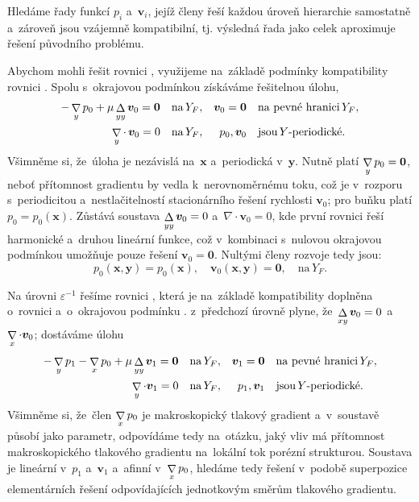 Hledáme řady funkcí $p_i$ a~$\bm{v}_i$, jejíž členy řeší každou úroveň hierarchie samostatně a~zároveň jsou vzájemně kompatibilní, tj. výsledná řada jako celek aproximuje řešení původního problému. 

Abychom mohli řešit rovnici , využijeme na~základě podmínky kompatibility rovnici . Spolu s~okrajovou podmínkou  získáváme řešitelnou úlohu,
\begin{subequations}
\begin{align}
    -\mathop{\nabla}\limits_{y} p_0 +\mu \mathop{\Delta}\limits_{yy} \bm{v}_0=\bm{0}\quad\textrm{na}\,Y_F,&&\bm{v}_0=\bm{0}\quad&\textrm{na pevné hranici}\,Y_F,\\
    \mathop{\nabla}\limits_{y} \cdot\, \bm{v}_0=0\quad\textrm{na}\,Y_F,&&p_0,\bm{v}_0\quad&\textrm{jsou}\,Y\textrm{-periodické}.
\end{align}
\end{subequations}
Všimněme si, že~úloha je nezávislá na~$\bm{x}$ a~periodická v~$\bm{y}$. Nutně platí $\mathop{\nabla}\limits_{y} p_0 = \bm{0}$, neboť přítomnost gradientu by vedla k~nerovnoměrnému toku, což je v~rozporu s~periodicitou a~nestlačitelností stacionárního řešení rychlosti $\bm{v}_0$; pro buňku platí $p_0=p_0(\bm{x})$. Zůstává soustava $\mathop{\Delta}\limits_{yy} \bm{v}_0=0$ a~$\nabla \cdot \bm{v}_0=0$, kde první rovnici řeší harmonické a~druhou lineární funkce, což v~kombinaci s~nulovou okrajovou podmínkou umožňuje pouze řešení $\bm{v}_0=\bm{0}$. Nultými členy rozvoje tedy jsou:
\begin{equation}
p_0(\bm{x},\bm{y})=p_0(\bm{x}),\quad \bm{v}_0(\bm{x},\bm{y})=\bm{0},\quad\textrm{na}\,Y_F.
\end{equation}

Na úrovni $\varepsilon^{-1}$ řešíme rovnici , která je na~základě kompatibility doplněna o~rovnici  a~o~okrajovou podmínku . z~předchozí úrovně plyne, že~$\mathop{\Delta}\limits_{xy} \bm{v}_0=0$ a~$\mathop{\nabla}\limits_{x} \cdot \bm{v}_0$; dostáváme úlohu
\begin{subequations}
\begin{align}
    -\mathop{\nabla}\limits_{y} p_1-\mathop{\nabla}\limits_{x} p_0 +\mu \mathop{\Delta}\limits_{yy} \bm{v}_1=\bm{0}\quad\textrm{na}\,Y_F,&&\bm{v}_1=\bm{0}\quad&\textrm{na pevné hranici}\,Y_F,\\
    \mathop{\nabla}\limits_{y} \cdot \bm{v}_1=0\quad\textrm{na}\,Y_F,&&p_1,\bm{v}_1\quad&\textrm{jsou}\,Y\textrm{-periodické}.
\end{align}
\end{subequations}
Všimněme si, že~člen $\mathop{\nabla}\limits_{x} p_0$ je makroskopický tlakový gradient a~v~soustavě působí jako parametr, odpovídáme tedy na~otázku, jaký vliv má přítomnost makroskopického tlakového gradientu na~lokální tok porézní strukturou. Soustava je lineární v~$p_1$ a~$\bm{v}_1$ a~afinní v~$\mathop{\nabla}\limits_{x} p_0$, hledáme tedy řešení v~podobě superpozice elementárních řešení odpovídajících jednotkovým směrům tlakového gradientu.

